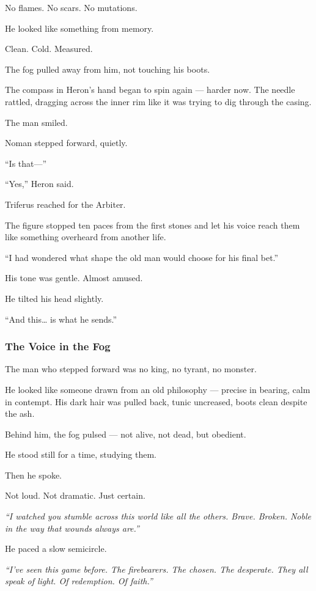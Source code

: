 \documentclass[12pt]{article}
\begin{document}
No flames. No scars. No mutations.

He looked like something from memory.

Clean. Cold. Measured.

The fog pulled away from him, not touching his boots.

The compass in Heron’s hand began to spin again — harder now. The needle rattled, dragging across the inner rim like it was trying to dig through the casing.

The man smiled.

Noman stepped forward, quietly.

“Is that—”

“Yes,” Heron said.

Triferus reached for the Arbiter.

The figure stopped ten paces from the first stones and let his voice reach them like something overheard from another life.

“I had wondered what shape the old man would choose for his final bet.”

His tone was gentle. Almost amused.

He tilted his head slightly.

“And this… is what he sends.”

\dotfill

\subsubsection{The Voice in the Fog}

The man who stepped forward was no king, no tyrant, no monster.

He looked like someone drawn from an old philosophy — precise in bearing, calm in contempt. His dark hair was pulled back, tunic uncreased, boots clean despite the ash.

Behind him, the fog pulsed — not alive, not dead, but obedient.

He stood still for a time, studying them.

Then he spoke.

Not loud. Not dramatic. Just certain.

\bigskip

\textit{“I watched you stumble across this world like all the others. Brave. Broken. Noble in the way that wounds always are.”}

He paced a slow semicircle.

\textit{“I’ve seen this game before. The firebearers. The chosen. The desperate. They all speak of light. Of redemption. Of faith.”}
\end{document}
